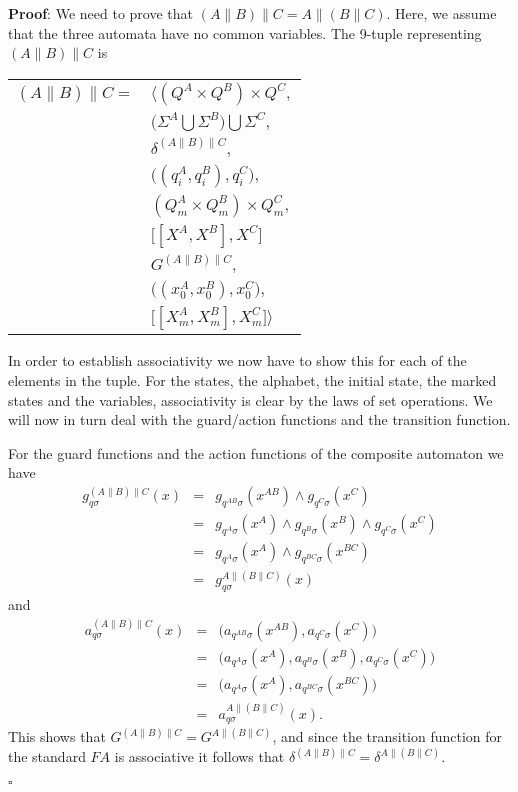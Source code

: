\documentclass{article}
\begin{document}
\noindent \textbf{Proof}: We need to prove that $(A\|B)\|C =
A\|(B\|C)$. Here, we assume that the three automata have no common
variables.
\newline\newline
\noindent The 9-tuple representing $(A\|B)\|C$ is
\begin{center}
\begin{tabular}{ll}
  $(A\|B)\|C =$ & $\Big \langle (Q^{A} \times Q^{B}) \times Q^{C},$\\
  & $ \big(\Sigma^{A} \bigcup \Sigma^{B} \big) \bigcup \Sigma^{C},$\\
  & $\delta^{(A\|B)\|C},$\\
  & $\big((q^{A}_i, q^{B}_i) , q^{C}_i\big),$\\
  & $(Q^{A}_m \times Q^{B}_m) \times Q^{C}_m,$\\
  & $\big[[X^{A}, X^{B}], X^{C}]$\\
  & $G^{(A\|B)\|C},$\\
  & $\big((x^{A}_0, x^{B}_0) , x^{C}_0\big),$\\
  & $\big[[X^{A}_m, X^{B}_m], X^{C}_m \big] \Big \rangle$
\end{tabular}
\end{center}

\noindent In order to establish associativity we now have to show
this for each of the elements in the tuple. For the states, the
alphabet, the initial state, the marked states and the variables,
associativity is clear by the laws of set operations. We will now
in turn deal with the guard/action functions and the transition
function.

For the guard functions and the action functions of the composite
automaton we have
\begin{eqnarray}
g^{(A\|B)\|C}_{q \sigma}(x)&=& g_{q^{AB}\sigma}(x^{AB})\wedge
g_{q^C\sigma}(x^{C})\nonumber\\
&=&g_{q^A\sigma}(x^{A})\wedge g_{q^B\sigma}(x^{B})\wedge
g_{q^C\sigma}(x^{C})\nonumber\\
&=& g_{q^{A}\sigma}(x^{A})\wedge g_{q^{BC}\sigma}(x^{BC})\nonumber\\
&=& g^{A\|(B\|C)}_{q \sigma}(x)
\end{eqnarray}
and
\begin{eqnarray}
a^{(A\|B)\|C}_{q \sigma}(x)&=&
 \big(a_{q^{AB} \sigma}(x^{AB}), a_{q^{C}
 \sigma}(x^{C})\big)\nonumber\\
&=&\big(a_{q^{A} \sigma}(x^{A}), a_{q^{B}
 \sigma}(x^{B}), a_{q^{C}
 \sigma}(x^{C})\big)\nonumber\\
&=&\big(a_{q^{A} \sigma}(x^{A}), a_{q^{BC}
 \sigma}(x^{BC})\big)\nonumber\\
&=&a^{A\|(B\|C)}_{q \sigma}(x).
\end{eqnarray}
This shows that $G^{(A\|B)\|C}=G^{A\|(B\|C)}$, and since the
transition function for the standard $FA$ is associative it
follows that $\delta^{(A\|B)\|C}=\delta^{A\|(B\|C)}$.
\begin{flushright}$\square$\end{flushright}
\end{document}
